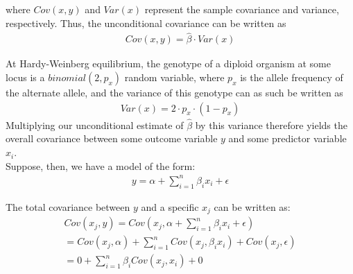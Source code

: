 \documentclass[12pt]{article}
\begin{document}
where $Cov(x,y)$ and $Var(x)$ represent the sample covariance and variance, respectively. Thus, the unconditional covariance can be written as
\begin{align}
Cov(x, y) = \hat{\beta}\cdot Var(x) \label{eq19}
\end{align}

At Hardy-Weinberg equilibrium, the genotype of a diploid organism at some locus is a $binomial(2, p_x)$ random variable, where $p_x$ is the allele frequency of the alternate allele, and the variance of this genotype can as such be written as 
\begin{align}
Var(x) = 2 \cdot p_x \cdot (1-p_x) \label{eq20}
\end{align} 
Multiplying our unconditional estimate of $\hat{\beta}$ by this variance therefore yields the overall covariance between some outcome variable $y$ and some predictor variable $x_i$.\\

Suppose, then, we have a model of the form:
\begin{align}
y = \alpha + \sum_{i=1}^{n}\beta_ix_i + \epsilon \label{eq21}
\end{align} 

The total covariance between $y$ and a specific $x_j$ can be written as:
\begin{align}
Cov(x_j, y) = Cov(x_j, \alpha + \sum_{i=1}^{n}\beta_ix_i + \epsilon) \label{eq22}\\
= Cov(x_j, \alpha) + \sum_{i=1}^{n}Cov(x_j, \beta_ix_i) + Cov(x_j, \epsilon) \label{eq23}\\
= 0 + \sum_{i=1}^{n}\beta_iCov(x_j, x_i) + 0 \label{eq24}
\end{align}
\end{document}
